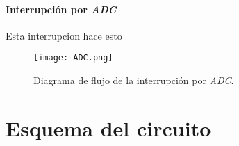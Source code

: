 \documentclass[12pt,a4paper]{article}
\begin{document}
	\paragraph{Interrupción por \emph{ADC}} Esta interrupcion hace esto
	
	\begin{figure}[H]
	\texttt{[image: ADC.png]}
	\centering
	\caption{Diagrama de flujo de la interrupción por \emph{ADC}.}
	\end{figure}
	

\section{Esquema del circuito}

	
\end{document}
